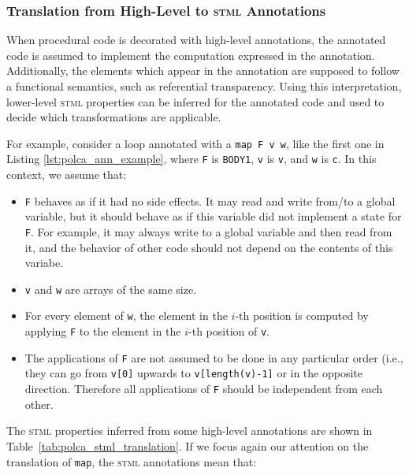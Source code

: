\documentclass[svgnames,usenames,preprint,nocopyrightspace]{sigplanconf}
\newcommand{\stml}{\textsc{stml}\xspace}
\begin{document}
\subsubsection{Translation from High-Level to \stml 
Annotations} 
\label{sec:polca-stml-translation}

When procedural code is decorated with high-level annotations, the
annotated code is assumed to implement the computation
expressed in the annotation. Additionally, the elements
which appear in the annotation are supposed to follow a functional
semantics, such as referential transparency.
Using this interpretation, lower-level \stml properties can be
inferred for the annotated code and used to decide which
transformations are applicable.

For example, consider a loop annotated with a \texttt{map F v w},
like the first one in Listing \ref{lst:polca_ann_example}, where 
\texttt{F} is \texttt{BODY1}, \texttt{v} is \texttt{v}, and \texttt{w} is \texttt{c}.
In this context, we assume that:

\begin{itemize}
\item \texttt{F} behaves as if it had no side effects.  It may read
  and write from/to a global variable, but it should behave as if this
  variable did not implement a state for \texttt{F}. For example, it
  may always write to a global variable and then read from it, and the
  behavior of other code should not depend on the contents of this
  variabe.
\item \texttt{v} and \texttt{w} are arrays of the same size.
\item For every element of \texttt{w}, the element in the $i$-th
  position is computed by applying \texttt{F} to the element in the
  $i$-th position of \texttt{v}.
\item The applications of \texttt{F} are not assumed to be done in any
  particular order (i.e., they can go from \texttt{v[0]} upwards to
  \texttt{v[length(v)-1]} or in the opposite direction.  Therefore
  all applications of \texttt{F} should be independent from each other.
\end{itemize}


The \stml properties inferred from some high-level annotations are shown in
Table~\ref{tab:polca_stml_translation}.  If we focus again our
attention on the translation of \texttt{map}, the \stml annotations
mean that:
\end{document}
